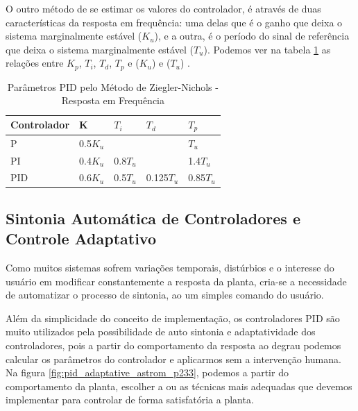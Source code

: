 O outro método de se estimar os valores do controlador, é através de duas características da resposta em frequência: uma delas que é o ganho que deixa o sistema marginalmente estável ($K_u$), e a outra, é o período do sinal de referência que deixa o sistema marginalmente estável ($T_u$). Podemos ver na tabela \ref{tab:Ziegler-Nichols-freq} as relações entre $K_p$, $T_i$, $T_d$, $T_p$ e ($K_u$) e ($T_u$) . 

\begin{table}
  \caption{Parâmetros PID pelo Método de Ziegler-Nichols - Resposta em Frequência}
  \label{tab:Ziegler-Nichols-freq}
  \centering%
  \begin{minipage}{.6\textwidth}
    \begin{tabular*}{\textwidth}{lllll}
      \hline
      {Controlador} & {K} & {$T_i$} & {$T_d$}& {$T_p$}\\ \hline
      \hline
      P    &  0.5$K_u$   &           &             & $T_u$  \\ 
      PI   &  0.4$K_u$   & 0.8$T_u$  &             & 1.4$T_u$ \\
      PID  &  0.6$K_u$   & 0.5$T_u$  & 0.125$T_u$  & 0.85$T_u$  \\ \hline
    \end{tabular*}
  \end{minipage}
\end{table}

\subsection{Sintonia Automática de Controladores e Controle Adaptativo}


Como muitos sistemas sofrem variações temporais, distúrbios e o interesse do usuário em modificar constantemente a resposta da planta, cria-se a necessidade de automatizar o processo de sintonia, ao um simples comando do usuário.

Além da simplicidade do conceito de implementação, os controladores PID são muito utilizados pela possibilidade de auto sintonia e adaptatividade dos controladores, pois a partir do comportamento da resposta ao degrau podemos calcular os parâmetros do controlador e aplicarmos sem a intervenção humana\cite{Astrom1995}. Na figura \ref{fig:pid_adaptative_astrom_p233}, podemos a partir do comportamento da planta, escolher a ou as técnicas mais adequadas que devemos implementar para controlar de forma satisfatória a planta.


